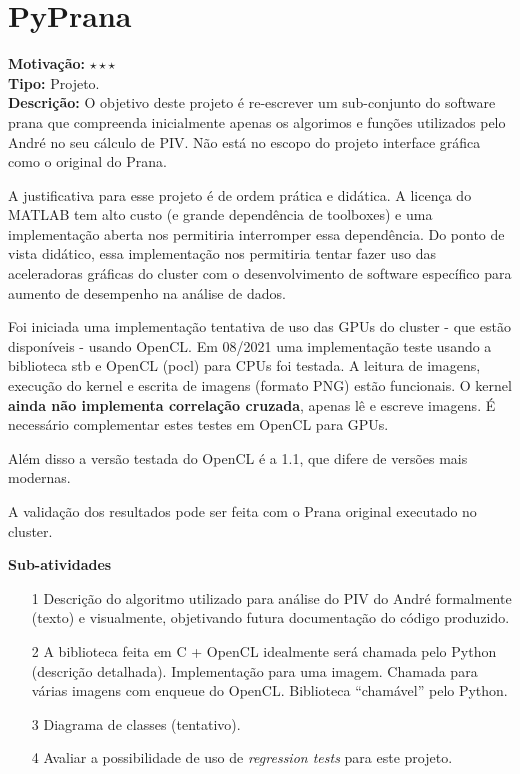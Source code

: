 \chapter{PyPrana}
\label{pyprana}

\textbf{Motivação:} $\star\star\star$\\

\textbf{Tipo:} Projeto.\\

\textbf{Descrição:} O objetivo deste projeto é re-escrever um sub-conjunto do 
software prana que compreenda inicialmente apenas os algorimos e funções 
utilizados pelo André no seu cálculo de PIV. Não está no escopo do projeto 
interface gráfica como o original do Prana.

A justificativa para esse projeto é de ordem prática e didática. A licença do 
MATLAB tem alto custo (e grande dependência de toolboxes) e uma implementação 
aberta nos permitiria interromper essa dependência. Do ponto de vista didático, 
essa implementação nos permitiria tentar fazer uso das aceleradoras gráficas 
do cluster com o desenvolvimento de software específico para aumento de 
desempenho na análise de dados.

Foi iniciada uma implementação tentativa de uso das GPUs do cluster - que estão
disponíveis - usando OpenCL. Em 08/2021 uma implementação teste usando a biblioteca
stb e OpenCL (pocl) para CPUs foi testada. A leitura de imagens, execução do kernel e
escrita de imagens (formato PNG) estão funcionais. O kernel \textbf{ainda não
  implementa correlação cruzada}, apenas lê e escreve imagens. É necessário
complementar estes testes em OpenCL para GPUs.

Além disso a versão testada do OpenCL é a 1.1, que difere de versões mais modernas.

A validação dos resultados pode ser feita com o Prana original executado no 
cluster.

\textbf{Sub-atividades}

\begin{itemize}
	\item[1] Descrição do algoritmo utilizado para análise do PIV do André 
	formalmente (texto) e visualmente, objetivando futura documentação do 
	código produzido.
      \item[2] A biblioteca feita em C + OpenCL idealmente será chamada pelo Python (descrição detalhada).
         Implementação para uma imagem.
         Chamada para várias imagens com enqueue do OpenCL.
         Biblioteca ``chamável'' pelo Python.
	\item[3] Diagrama de classes (tentativo).
	\item[4] Avaliar a possibilidade de uso de \textit{regression tests} para 
	este projeto.
\end{itemize}

